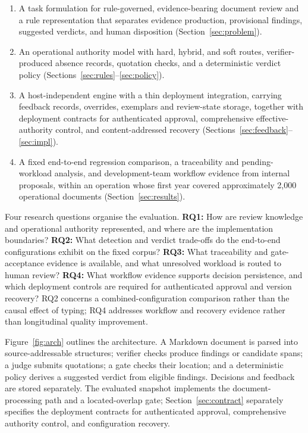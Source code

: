 \documentclass[computers,article,submit,moreauthors]{Definitions/mdpi}
\begin{document}
\begin{enumerate}[label=(\arabic*),leftmargin=*]
\item A task formulation for rule-governed, evidence-bearing document review and a rule representation that separates evidence production, provisional findings, suggested verdicts, and human disposition (Section~\ref{sec:problem}).
\item An operational authority model with hard, hybrid, and soft routes, verifier-produced absence records, quotation checks, and a deterministic verdict policy (Sections~\ref{sec:rules}--\ref{sec:policy}).
\item A host-independent engine with a thin deployment integration, carrying feedback records, overrides, exemplars and review-state storage, together with deployment contracts for authenticated approval, comprehensive effective-authority control, and content-addressed recovery (Sections~\ref{sec:feedback}--\ref{sec:impl}).
\item A fixed end-to-end regression comparison, a traceability and pending-workload analysis, and development-team workflow evidence from internal proposals, within an operation whose first year covered approximately 2,000 operational documents (Section~\ref{sec:results}).
\end{enumerate}

Four research questions organise the evaluation. \textbf{RQ1:} How are review knowledge and operational authority represented, and where are the implementation boundaries? \textbf{RQ2:} What detection and verdict trade-offs do the end-to-end configurations exhibit on the fixed corpus? \textbf{RQ3:} What traceability and gate-acceptance evidence is available, and what unresolved workload is routed to human review? \textbf{RQ4:} What workflow evidence supports decision persistence, and which deployment controls are required for authenticated approval and version recovery? RQ2 concerns a combined-configuration comparison rather than the causal effect of typing; RQ4 addresses workflow and recovery evidence rather than longitudinal quality improvement.

Figure~\ref{fig:arch} outlines the architecture. A Markdown document is parsed into source-addressable structures; verifier checks produce findings or candidate spans; a judge submits quotations; a gate checks their location; and a deterministic policy derives a suggested verdict from eligible findings. Decisions and feedback are stored separately. The evaluated snapshot implements the document-processing path and a located-overlap gate; Section~\ref{sec:contract} separately specifies the deployment contracts for authenticated approval, comprehensive authority control, and configuration recovery.
\end{document}
